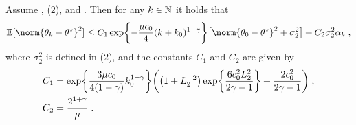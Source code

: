 \begin{lemma}
\label{lem:bound_last_iter_second_moment}
Assume , ($2$),  and  . Then for any $k \in \mathbb{N}$ it holds that 
\begin{equation}
\label{eq:bound_last_iter_second_moment}
\PE[\norm{\theta_k - \thetas}^{2}] \leq C_{1} \exp\biggl\{-\frac{\mu c_0}{4} (k+k_0)^{1-\gamma}\biggr\} \bigl[ \norm{\theta_0-\thetas}^2 + \sigma_2^2\bigr] + C_{2} \sigma_2^2 \alpha_{k}  \eqsp,
\end{equation}
where $\sigma_2^2$ is defined in ($2$), and the constants $C_1$ and $C_2$ are given by 
\begin{equation}
\label{eq:const_C_1_C_2_def}
\begin{split}
C_{1} &= \exp\biggl\{\frac{3\mu c_0}{4(1-\gamma)}k_0^{1-\gamma}\biggr\}\biggl(\left(1 + L_2^{-2}\right) \exp\biggl\{\frac{6c_0^2L_2^2}{2\gamma-1}\biggr\} + \frac{2c_{0}^2}{2\gamma-1}\biggr) \;,\\
C_{2} &= \frac{2^{1+\gamma}}{\mu}\;.
\end{split}
\end{equation}
\end{lemma}
